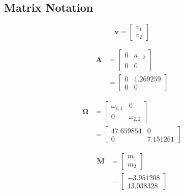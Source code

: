 \documentclass[
]{book}
\begin{document}
\hypertarget{matrix-notation-1}{%
\subsection{Matrix Notation}\label{matrix-notation-1}}

\begin{equation}
  \mathbf{v}
  =
  \begin{bmatrix}
    v_1 \\
    v_2
  \end{bmatrix}
\end{equation}

\begin{equation}
  \begin{split}
    \mathbf{A}
    &=
    \begin{bmatrix}
      0 & a_{1, 2} \\
      0 & 0
    \end{bmatrix} \\
    &=
    \begin{bmatrix}
      0 & 1.269259 \\
      0 & 0
    \end{bmatrix}
  \end{split}
\end{equation}

\begin{equation}
  \begin{split}
    \boldsymbol{\Omega}
    &=
    \begin{bmatrix}
      \omega_{1, 1} & 0             \\
      0             & \omega_{2, 2}
    \end{bmatrix} \\
    &=
    \begin{bmatrix}
      47.659854 & 0 \\
      0 & 7.151261
    \end{bmatrix}
  \end{split}
\end{equation}

\begin{equation}
  \begin{split}
    \mathbf{M}
    &=
    \begin{bmatrix}
      m_1 \\
      m_2
    \end{bmatrix} \\
    &=
    \begin{bmatrix}
      -3.951208 \\
      13.038328
    \end{bmatrix}
  \end{split}
\end{equation}
\end{document}
